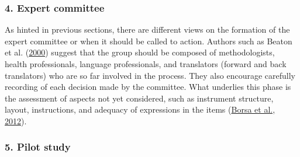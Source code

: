\documentclass[
  ,doc,11pt, twoside,floatsintext]{apa6}
\begin{document}
\hypertarget{expert-committee}{%
\subsubsection{4. Expert committee}\label{expert-committee}}

As hinted in previous sections, there are different views on the formation of the expert committee or when it should be called to action. Authors such as Beaton et al. (\protect\hyperlink{ref-beaton2000}{2000}) suggest that the group should be composed of methodologists, health professionals, language professionals, and translators (forward and back translators) who are so far involved in the process. They also encourage carefully recording of each decision made by the committee. What underlies this phase is the assessment of aspects not yet considered, such as instrument structure, layout, instructions, and adequacy of expressions in the items (\protect\hyperlink{ref-borsaAdaptacaoValidacaoInstrumentos2012}{Borsa et al., 2012}).

\hypertarget{pilot-study}{%
\subsubsection{5. Pilot study}\label{pilot-study}}
\end{document}
